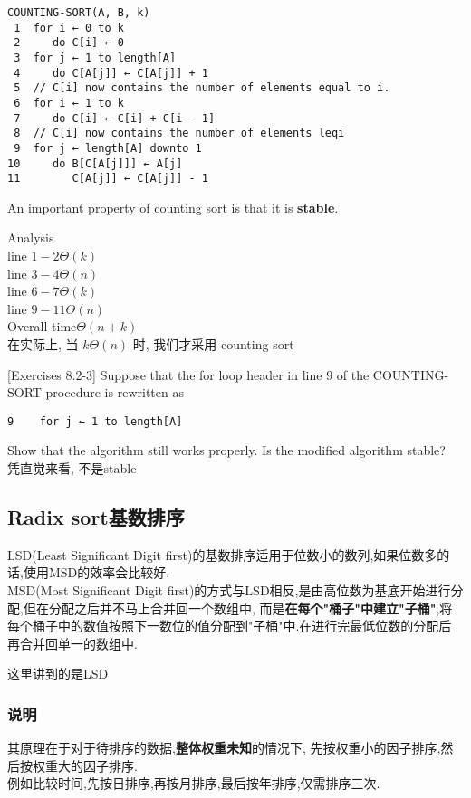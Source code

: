 \documentclass{article}
\begin{document}
\begin{verbatim}
COUNTING-SORT(A, B, k)
 1  for i ← 0 to k
 2     do C[i] ← 0
 3  for j ← 1 to length[A]
 4     do C[A[j]] ← C[A[j]] + 1
 5  // C[i] now contains the number of elements equal to i.
 6  for i ← 1 to k
 7     do C[i] ← C[i] + C[i - 1]
 8  // C[i] now contains the number of elements leqi
 9  for j ← length[A] downto 1
10     do B[C[A[j]]] ← A[j]
11        C[A[j]] ← C[A[j]] - 1
\end{verbatim}

An important property of counting sort is that it is \textbf{stable}.

Analysis\\
line $1-2 \Theta(k)$\\
line $3-4 \Theta(n)$\\
line $6-7 \Theta(k)$\\
line $9-11 \Theta(n)$\\
Overall time$\Theta(n+k)$\\
在实际上, 当 $k\Theta(n)$ 时, 我们才采用 counting sort

[Exercises 8.2-3] Suppose that the for loop header in line $9$ of the COUNTING-SORT procedure is rewritten as
\begin{verbatim}
9	 for j ← 1 to length[A]
\end{verbatim}
Show that the algorithm still works properly. Is the modified algorithm stable?\\
凭直觉来看, 不是stable

\subsection{Radix sort基数排序}
LSD(Least Significant Digit first)的基数排序适用于位数小的数列,如果位数多的话,使用MSD的效率会比较好.\\
MSD(Most Significant Digit first)的方式与LSD相反,是由高位数为基底开始进行分配,但在分配之后并不马上合并回一个数组中,
而是\textbf{在每个"桶子"中建立"子桶"},将每个桶子中的数值按照下一数位的值分配到"子桶"中.在进行完最低位数的分配后再合并回单一的数组中.

这里讲到的是LSD

\subsubsection{说明}
其原理在于对于待排序的数据,\textbf{整体权重未知}的情况下,
先按权重小的因子排序,然后按权重大的因子排序.\\
例如比较时间,先按日排序,再按月排序,最后按年排序,仅需排序三次.
\end{document}
